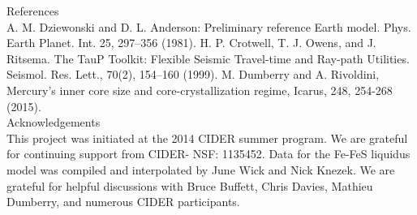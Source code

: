 \documentclass[landscape,a0b,final]{a0poster}
\begin{document}
\begin{multicols}{3}
{ \large References \\ \small
A. M. Dziewonski and D. L. Anderson: Preliminary reference Earth model. Phys. Earth Planet. Int. 25, 297–356 (1981).
H. P. Crotwell, T. J. Owens, and J. Ritsema. The TauP Toolkit: Flexible Seismic Travel-time and Ray-path Utilities. Seismol. Res. Lett., 70(2), 154–160 (1999). 
M. Dumberry and A. Rivoldini, Mercury’s inner core size and core-crystallization regime, Icarus, 248, 254-268 (2015).
 }
\\
{ \large Acknowledgements \\ \small
This project was initiated at the 2014 CIDER summer program.  We are grateful for continuing support from CIDER- NSF: 1135452.
Data for the Fe-FeS liquidus model was compiled and interpolated by June Wick and Nick Knezek.
We are grateful for helpful discussions with Bruce Buffett, Chris Davies, Mathieu Dumberry, and numerous CIDER participants.
}

\end{multicols}
\end{document}
